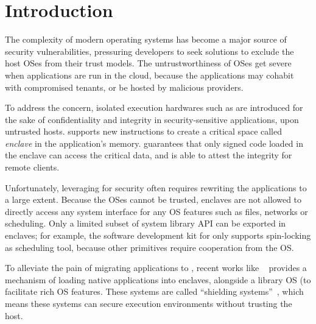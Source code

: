 \section{Introduction}

The complexity of modern operating systems has become
a major source of security vulnerabilities,
pressuring developers to seek solutions to exclude the host OSes
from their trust models.
The untrustworthiness of OSes get severe when applications are run in the cloud,
because the applications may cohabit with compromised tenants,
or be hosted by malicious providers.

To address the concern,
isolated execution hardwares such as \sgx{} are introduced
for the sake of confidentiality and integrity in
security-sensitive applications,
upon untrusted hosts.
\sgx{} supports new instructions to create a
critical space called {\it enclave} in the application's memory.
\sgx{} guarantees that only signed code loaded in the enclave can access the critical data,
and is able to attest the integrity for remote clients.


Unfortunately, leveraging \sgx{} for security
often requires rewriting the applications to a large extent.
Because the OSes cannot be trusted,
enclaves are not allowed to directly access any system interface
for any OS features
such as files, networks or scheduling.
Only a limited subset of system library API can be exported in enclaves;
for example, the software development kit for \sgx{}
only supports spin-locking as scheduling tool,
because other primitives require cooperation from the OS.

To alleviate the pain of migrating applications to \sgx{},
recent works like \haven{}~\citep{baumann14haven} provides a mechanism
of loading native applications into enclaves,
alongside a library OS (\libos{) }to facilitate rich OS features.
These systems are called ``shielding systems''~\citep{xu15controlledchannel},
which means these systems can secure execution environments
without trusting the host.

